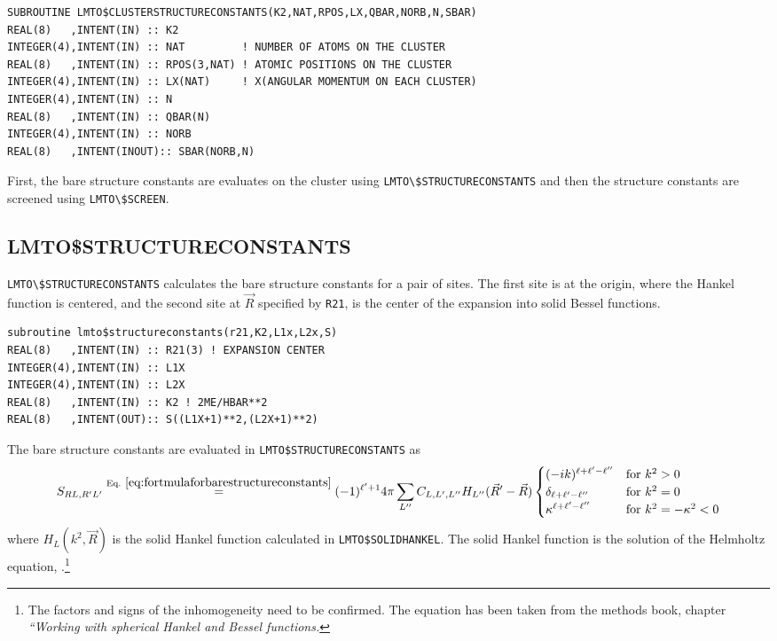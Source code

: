 \documentclass[11pt,a4paper]{report}
\begin{document}
\begin{verbatim}
SUBROUTINE LMTO$CLUSTERSTRUCTURECONSTANTS(K2,NAT,RPOS,LX,QBAR,NORB,N,SBAR)
REAL(8)   ,INTENT(IN) :: K2          
INTEGER(4),INTENT(IN) :: NAT         ! NUMBER OF ATOMS ON THE CLUSTER
REAL(8)   ,INTENT(IN) :: RPOS(3,NAT) ! ATOMIC POSITIONS ON THE CLUSTER
INTEGER(4),INTENT(IN) :: LX(NAT)     ! X(ANGULAR MOMENTUM ON EACH CLUSTER)
INTEGER(4),INTENT(IN) :: N
REAL(8)   ,INTENT(IN) :: QBAR(N)
INTEGER(4),INTENT(IN) :: NORB
REAL(8)   ,INTENT(INOUT):: SBAR(NORB,N)
\end{verbatim}




First, the bare structure constants are evaluates on the cluster using
\verb|LMTO\$STRUCTURECONSTANTS| and then the structure constants are
screened using \verb|LMTO\$SCREEN|.

\subsection{LMTO\$STRUCTURECONSTANTS}
\verb|LMTO\$STRUCTURECONSTANTS| calculates the bare structure
constants for a pair of sites. The first site is at the origin, where
the Hankel function is centered, and the second site at $\vec{R}$
specified by \verb|R21|, is the center of the expansion into solid
Bessel functions.

\begin{verbatim}
subroutine lmto$structureconstants(r21,K2,L1x,L2x,S)
REAL(8)   ,INTENT(IN) :: R21(3) ! EXPANSION CENTER
INTEGER(4),INTENT(IN) :: L1X
INTEGER(4),INTENT(IN) :: L2X
REAL(8)   ,INTENT(IN) :: K2 ! 2ME/HBAR**2
REAL(8)   ,INTENT(OUT):: S((L1X+1)**2,(L2X+1)**2)
\end{verbatim}

The bare structure constants are evaluated in 
\verb|LMTO$STRUCTURECONSTANTS| as
\begin{eqnarray}
S_{RL,R'L'}\eqrel{eq:fortmulaforbarestructureconstants}{=}
(-1)^{\ell'+1} 4\pi \sum_{L''} C_{L,L',L''} 
H_{L''}(\vec{R}'-\vec{R})
\begin{cases}
(-ik)^{\ell+\ell'-\ell''}&\text{for $k^2>0$}\\
\delta_{\ell+\ell'-\ell''}&\text{for $k^2=0$}\\
\kappa^{\ell+\ell'-\ell''}&\text{for $k^2=-\kappa^2<0$}\\
\end{cases}
\label{eq:fortmulaforbarestructureconstantscopy1}
\end{eqnarray}
where $H_L(k^2,\vec{R})$ is the solid Hankel function calculated in
\verb|LMTO$SOLIDHANKEL|. The solid Hankel function is the solution of
the Helmholtz equation, .\footnote{The
  factors and signs of the inhomogeneity need to be confirmed. The
  equation has been taken from the methods book, chapter
  \textit{``Working with spherical Hankel and Bessel functions.}}
\end{document}
